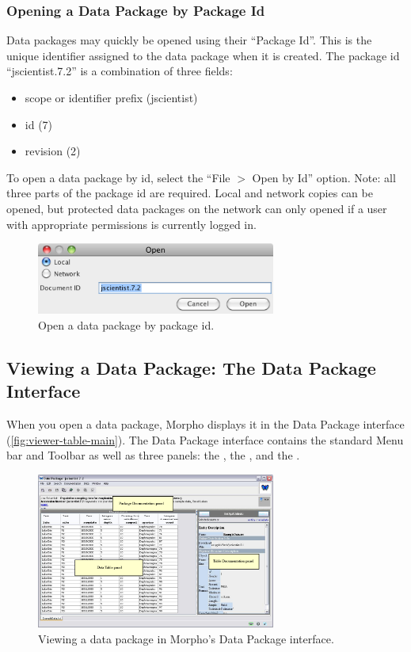 \subsubsection{Opening a Data Package by Package Id}

Data packages may quickly be opened using their ``Package Id''.
This is the unique identifier assigned to the data package when it is created.
The package id ``jscientist.7.2'' is a combination of three fields:
\begin{itemize}
  \item scope or identifier prefix (jscientist)
  \item id (7)
  \item revision (2)
\end{itemize}

To open a data package by id, select the ``File $>$ Open by Id'' option. 
Note: all three parts of the package id are required. 
Local and network copies can be opened, but protected data packages on the 
network can only opened if a user with appropriate permissions is currently logged in.

\begin{figure}
  \centering
    \includegraphics[width=0.7\textwidth]{images/open-by-id.png}
  \caption{Open a data package by package id.}
  \label{fig:open-by-id}
\end{figure}

\subsection{Viewing a Data Package: The Data Package Interface}

When you open a data package, Morpho displays it in the Data Package
interface (\autoref{fig:viewer-table-main}). The Data Package interface
contains the standard Menu bar and Toolbar as well as three panels: the
, the , and the
.

\begin{figure}
  \centering
    \includegraphics[width=0.7\textwidth]{images/viewer-table-main.jpg}
  \caption{Viewing a data package in Morpho's Data Package interface.}
  \label{fig:viewer-table-main}
\end{figure}

